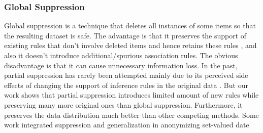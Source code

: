 \begin{table*}[thb]
\caption{The Same Dataset in Table \ref{tab:sample} and Generalization Anonymization Result
\label{tab:samesample}}
\centering
{}

\end{table*}

\subsubsection{Global Suppression}

Global suppression is a technique that deletes all instances of some items
so that the resulting dataset is safe.
The advantage is that it preserves the support of
existing rules that don't involve deleted items and hence retains these rules
\cite{Xu:2008:ATD}, and also it doesn't introduce
additional/spurious association rules.
The obvious disadvantage is that it can cause unnecessary
information loss. In the past, partial suppression
has rarely been attempted mainly due to its perceived side effects of
changing the support of inference rules in the original data
\cite{Xu:2008:ATD,Cao:2010:rho,tkde:VerykiosEBSD04:ARH,tkde:WuCC07:hiding}.
But our work shows that partial suppression introduces limited
amount of new rules while preserving many more original ones than
global suppression. Furthermore,
it preserves the data distribution much better than
other competing methods.
Some work integrated suppression and generalization in anonymizing set-valued date \cite{liu2010anonymizing,Cao:2010:rho}
